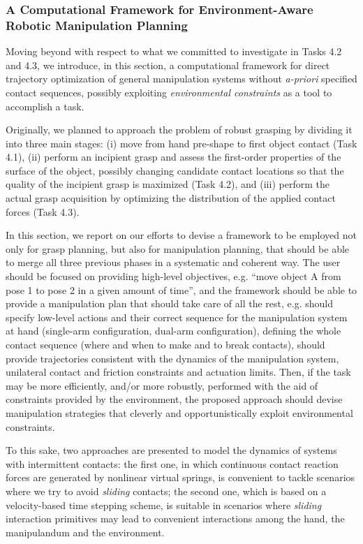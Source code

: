 
\subsubsection{A Computational Framework for Environment-Aware Robotic Manipulation Planning}

Moving beyond with respect to what we committed to investigate in Tasks 4.2 and 4.3, we introduce, in this section, a computational framework for direct trajectory optimization of general manipulation systems without \textsl{a-priori} specified contact sequences, possibly exploiting \emph{environmental constraints} as a tool to accomplish a task.
 
 Originally, we planned to approach the problem of robust grasping by dividing it into three main stages: (i) move from hand pre-shape to first object contact (Task 4.1), (ii) perform an incipient grasp and assess the first-order properties of the surface of the object, possibly changing candidate contact locations so that the quality of the incipient grasp is maximized (Task 4.2), and (iii) perform the actual grasp acquisition by optimizing the distribution of the applied contact forces (Task 4.3).
 
 In this section, we report on our efforts to devise a framework to be employed not only for grasp planning, but also for manipulation planning, that should be able to merge all three previous phases in a systematic and coherent way. The user should be focused on providing high-level objectives, e.g. ``move object A from pose 1 to pose 2 in a given amount of time'', and the framework should be able to provide a manipulation plan that should take care of all the rest, e.g. should specify low-level actions and their correct sequence for the manipulation system at hand (single-arm configuration, dual-arm configuration),  defining the whole contact sequence (where and when to make and to break contacts), should provide trajectories consistent with the dynamics of the manipulation system, unilateral contact and friction constraints and actuation limits. Then, if the task may be more efficiently, and/or more robustly, performed with the aid of constraints provided by the environment, the proposed approach should devise manipulation strategies that cleverly and opportunistically exploit environmental constraints.
 
 To this sake, two approaches are presented to model the dynamics of systems with intermittent contacts: the first one, in which continuous contact reaction forces are generated  by nonlinear virtual springs, is convenient to tackle scenarios where we try to avoid \emph{sliding} contacts; the second one, which is based on a velocity-based time stepping scheme, is suitable in scenarios where \emph{sliding} interaction primitives may lead to convenient interactions among the hand, the manipulandum and the environment.

